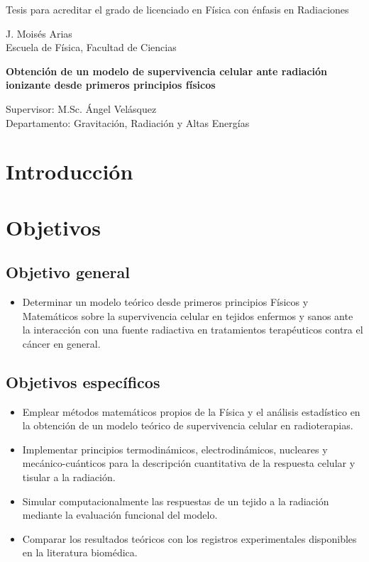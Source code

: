 \documentclass[12pt,letterpaper, oneside]{book}
\begin{document}
\begin{titlepage}
\begin{center}
			\vspace{0.75cm}
			\Large Tesis para acreditar el grado de licenciado en Física con énfasis en Radiaciones\\
			
			\vspace{1.25cm}		
			
			\large{J. Moisés Arias}\\
			\small{Escuela de Física, Facultad de Ciencias}
			
			\vfill
			
			\large{\textbf{Obtención de un modelo de supervivencia celular ante radiación ionizante desde primeros principios físicos}}
			\vspace{0.75cm}
			
			\large Supervisor: M.Sc. Ángel Velásquez\\
			Departamento: Gravitación, Radiación y Altas Energías
		\end{center}
	\end{titlepage}
	
	\tableofcontents
	
	\chapter*{Introducción}
	
	\chapter*{Objetivos}
	
	\section*{Objetivo general}
	\begin{itemize}
		\item Determinar un modelo teórico desde primeros principios Físicos y Matemáticos sobre la supervivencia celular en tejidos enfermos y sanos ante la interacción con una fuente radiactiva en tratamientos terapéuticos contra el cáncer en general.
	\end{itemize}
	\section*{Objetivos específicos}
	\begin{itemize}
		\item Emplear métodos matemáticos propios de la Física y el análisis estadístico en la obtención de un modelo teórico de supervivencia celular en radioterapias. 
		\item Implementar principios termodinámicos, electrodinámicos, nucleares y mecánico-cuánticos para la descripción cuantitativa de la respuesta celular y tisular a la radiación. 
		\item Simular computacionalmente las respuestas de un tejido a la radiación mediante la evaluación funcional del modelo. 
		\item Comparar los resultados teóricos con los registros experimentales disponibles en la literatura biomédica. 
	\end{itemize}
	
\end{document}
